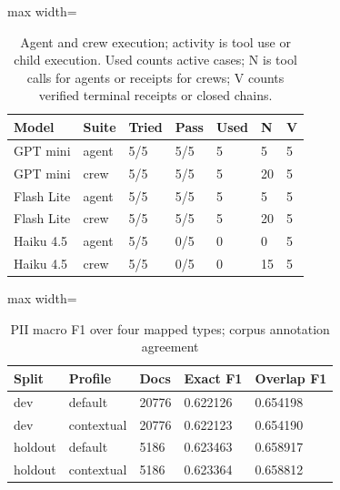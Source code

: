 \begin{table}[t]
\centering
\caption{Agent and crew execution; activity is tool use or child execution. Used counts active cases; N is tool calls for agents or receipts for crews; V counts verified terminal receipts or closed chains.}
\label{tab:validated-agents}
\begingroup\small\setlength{\tabcolsep}{3pt}
\begin{adjustbox}{max width=\linewidth}
\begin{tabular}{lllllll}
\hline
Model & Suite & Tried & Pass & Used & N & V \\
\hline
GPT mini & agent & 5/5 & 5/5 & 5 & 5 & 5 \\
GPT mini & crew & 5/5 & 5/5 & 5 & 20 & 5 \\
Flash Lite & agent & 5/5 & 5/5 & 5 & 5 & 5 \\
Flash Lite & crew & 5/5 & 5/5 & 5 & 20 & 5 \\
Haiku 4.5 & agent & 5/5 & 0/5 & 0 & 0 & 5 \\
Haiku 4.5 & crew & 5/5 & 0/5 & 0 & 15 & 5 \\
\hline
\end{tabular}
\end{adjustbox}\endgroup
\end{table}

\begin{table}[t]
\centering
\caption{PII macro F1 over four mapped types; corpus annotation agreement}
\label{tab:validated-pii}
\begingroup\small\setlength{\tabcolsep}{3pt}
\begin{adjustbox}{max width=\linewidth}
\begin{tabular}{lllll}
\hline
Split & Profile & Docs & Exact F1 & Overlap F1 \\
\hline
dev & default & 20776 & 0.622126 & 0.654198 \\
dev & contextual & 20776 & 0.622123 & 0.654190 \\
holdout & default & 5186 & 0.623463 & 0.658917 \\
holdout & contextual & 5186 & 0.623364 & 0.658812 \\
\hline
\end{tabular}
\end{adjustbox}\endgroup
\end{table}

